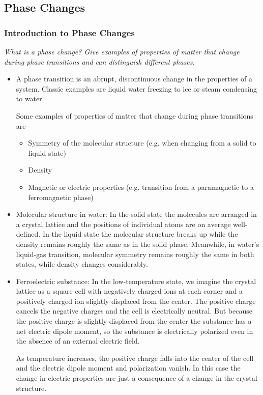 \documentclass[11pt, a4paper]{article}
\begin{document}
\subsection{Phase Changes}

\subsubsection{Introduction to Phase Changes}
\textit{What is a phase change? Give examples of properties of matter that change during phase transitions and can distinguish different phases.}

\begin{itemize}
	\item A phase transition is an abrupt, discontinuous change in the properties of a system. Classic examples are liquid water freezing to ice or steam condensing to water.  
	
	Some examples of properties of matter that change during phase transitions are
	\begin{itemize}
		\item Symmetry of the molecular structure (e.g. when changing from a solid to liquid state)
		\item Density
		\item Magnetic or electric properties (e.g. transition from a paramagnetic to a ferromagnetic phase)
	\end{itemize}
	
	\item Molecular structure in water:  In the solid state the molecules are arranged in a crystal lattice and the positions of individual atoms are on average well-defined. In the liquid state the molecular structure breaks up while the density remains roughly the same as in the solid phase. Meanwhile, in water's liquid-gas transition, molecular symmetry remains roughly the same in both states, while density changes considerably.
	
	\item Ferroelectric substance: In the low-temperature state, we imagine the crystal lattice as a  square cell with negatively charged ions at each corner and a positively charged ion slightly displaced from the center. The positive charge cancels the negative charges and the cell is electrically neutral. But because the positive charge is slightly displaced from the center the substance has a net electric dipole moment, so the substance is electrically polarized even in the absence of an external electric field.
	
	As temperature increases, the positive charge falls into the center of the cell and the electric dipole moment and polarization vanish. In this case the change in electric properties are just a consequence of a change in the crystal structure.
	

	
\end{itemize}
\end{document}
